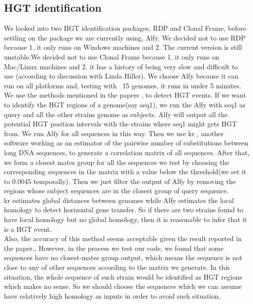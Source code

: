 \documentclass[12pt]{article}
\newcommand{\tab}{\hspace*{3em}}
\begin{document}
\subsection{HGT identification}
\tab We looked into two HGT identification packages, RDP and Clonal Frame, before settling on the package we are currently using, Alfy. We decided not to use RDP \cite{RDP} because 1. it only runs on Windows machines and 2. The current version is still unstable.We decided not to use Clonal Frame \cite{Clonal Frame} because 1. it only runs on Mac/Linux machines and 2. it has a history of being very slow and difficult to use (according to discussion with Linda Hiller). We choose Alfy \cite{Alfy} because it can run on all platforms and, testing with ~15 genomes, it runs in under 5 minutes.\\
\tab We use the methods mentioned in the papers \cite{Alfy},\cite{kr} to detect HGT events. If we want to identify the HGT regions of a genome(say seq1), we run the Alfy with seq1 as query and all the other strains genome as subjects. Alfy will output all the potential HGT position intervals with the strains where seq1 might gets HGT from. We run Alfy for all sequences in this way. Then we use kr \cite{kr}, another software working as an estimator of the pairwise number of substitutions between long DNA sequences, to generate a correlation matrix of all sequences. After that, we form a closest mates group for all the sequences we test by choosing the corresponding sequences in the matrix with a value below the threshold(we set it to 0.0045 temporally). Then we just filter the output of Alfy by removing the regions whose subject sequences are in the closest group of query sequence.\\
\tab kr estimates global distances between genomes while Alfy estimates the local homology to detect horizontal gene transfer. So if there are two strains found to have local homology but no global homology, then it is reasonable to infer that it is a HGT event.\\
\tab Also, the accuracy of this method seems acceptable given the result reported in the paper\cite{Alfy},\cite{kr}. However, in the process we test our code, we found that some sequences have no closest-mates group output, which means the sequence is not close to any of other sequences according to the matrix we generate. In this situation, the whole sequence of such strain would be identified as HGT regions which makes no sense. So we should choose the sequences which we can assume have relatively high homology as inputs in order to avoid such situation. \\
\end{document}
